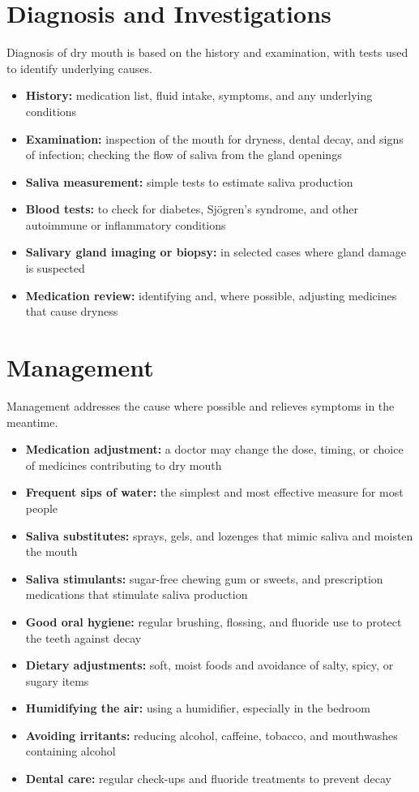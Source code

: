 \section*{Diagnosis and Investigations}
Diagnosis of dry mouth is based on the history and examination, with tests used to identify underlying causes.
\begin{itemize}
    \item \textbf{History:} medication list, fluid intake, symptoms, and any underlying conditions
    \item \textbf{Examination:} inspection of the mouth for dryness, dental decay, and signs of infection; checking the flow of saliva from the gland openings
    \item \textbf{Saliva measurement:} simple tests to estimate saliva production
    \item \textbf{Blood tests:} to check for diabetes, Sjögren's syndrome, and other autoimmune or inflammatory conditions
    \item \textbf{Salivary gland imaging or biopsy:} in selected cases where gland damage is suspected
    \item \textbf{Medication review:} identifying and, where possible, adjusting medicines that cause dryness
\end{itemize}

\section*{Management}
Management addresses the cause where possible and relieves symptoms in the meantime.
\begin{itemize}
    \item \textbf{Medication adjustment:} a doctor may change the dose, timing, or choice of medicines contributing to dry mouth
    \item \textbf{Frequent sips of water:} the simplest and most effective measure for most people
    \item \textbf{Saliva substitutes:} sprays, gels, and lozenges that mimic saliva and moisten the mouth
    \item \textbf{Saliva stimulants:} sugar-free chewing gum or sweets, and prescription medications that stimulate saliva production
    \item \textbf{Good oral hygiene:} regular brushing, flossing, and fluoride use to protect the teeth against decay
    \item \textbf{Dietary adjustments:} soft, moist foods and avoidance of salty, spicy, or sugary items
    \item \textbf{Humidifying the air:} using a humidifier, especially in the bedroom
    \item \textbf{Avoiding irritants:} reducing alcohol, caffeine, tobacco, and mouthwashes containing alcohol
    \item \textbf{Dental care:} regular check-ups and fluoride treatments to prevent decay
\end{itemize}

